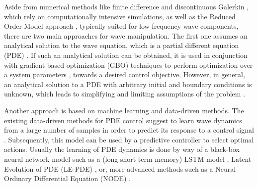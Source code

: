 Aside from numerical methods like finite difference \cite{kreiss2002difference,leveque2007finite,angel2023efficient} and discontinuous Galerkin \cite{cockburn2012discontinuous,shu2016high}, which rely on computationally intensive simulations, as well as the Reduced Order Model approach \cite{Morris_Amirkizi2023_ROM,Wang2023T_ROM}, typically suited for low-frequency wave components, there are two main approaches for wave manipulation.
The first one assumes an analytical solution to the wave equation, which is a partial different equation (PDE) \cite{courant1967partial}. If such an analytical solution can be obtained, it is used in conjunction with gradient based optimization (GBO) techniques to perform optimization over a system parameters \cite{amirkulova_2020_the,Amirkulova_etal2021, Amirkulova_Gerges_Norris_2022,GergesAmirkulova2024}, towards a desired control objective. However, in general, an analytical solution to a PDE with arbitrary initial and boundary conditions is unknown, which leads to simplifying and limiting assumptions of the problem \cite{amirkulova_2020_the}.



 







Another approach is based on machine learning and data-driven methods. The existing data-driven methods for PDE control suggest to learn wave dynamics from a large number of samples in order to predict its response to a control signal \cite{werner_2023_learning, bieker_2020_deep}. Subsequently, this model can be used by a predictive controller to select optimal actions. Usually the learning of PDE dynamics is done by way of a black-box neural network model such as a (long short term memory) LSTM model \cite{werner_2023_learning, bieker_2020_deep}, Latent Evolution of PDE (LE-PDE) \cite{wu_2022_learning}, or, more advanced methods such as a Neural Ordinary Differential Equation (NODE) \cite{_2019_neural}. 

